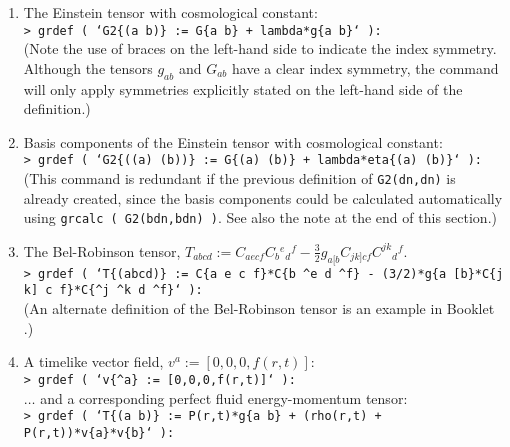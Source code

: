 \documentclass{article}
\begin{document}
{\begin{enumerate}
    \texttt{> grdef ( `phi := R\{a b\}*u\{\^{}a\}*u\{\^{}b\}` ):}\\

  \item The Einstein tensor with cosmological constant:\\

    \texttt{> grdef ( `G2\{(a b)\} := G\{a b\} + lambda*g\{a b\}` ):}\\

    (Note the use of braces on the left-hand side to indicate the index 
    symmetry. Although the tensors $g_{ab}$ and $G_{ab}$ have a clear
    index symmetry, the  command will only apply symmetries
    explicitly stated on the left-hand side of the definition.)

  \item Basis components of the Einstein tensor with cosmological constant:\\

    \texttt{> grdef ( `G2\{((a) (b))\} := G\{(a) (b)\} +
      lambda*eta\{(a) (b)\}` ):}\\

    (This command is redundant if the previous definition of \texttt{G2(dn,dn)}
    is already created, since the basis components could be calculated
    automatically using \texttt{grcalc ( G2(bdn,bdn) )}. See also the note
    at the end of this section.)

  \item The Bel-Robinson tensor,
    $T_{abcd} := C_{aecf} C_b{}^e{}_d{}^f -
    \frac{3}{2} g_{a[b} C_{jk]cf} C^{jk}{}_d{}^f$.\\

    \texttt{> grdef ( `T\{(abcd)\} := C\{a e c f\}*C\{b \^{}e d \^{}f\}
      - (3/2)*g\{a [b\}*C\{j k] c f\}*C\{\^{}j \^{}k d \^{}f\}` ):}\\

    (An alternate definition of the Bel-Robinson tensor is an example
    in Booklet \grIntroRef.)

  \item A timelike vector field, $v^a := [0,0,0,f(r,t)]$:\\

    \texttt{> grdef ( `v\{\^{}a\} := [0,0,0,f(r,t)]` ):}\\

  $\ldots$ and a corresponding perfect fluid energy-momentum tensor:\\

    \texttt{> grdef ( `T\{(a b)\} := P(r,t)*g\{a b\}
      + (rho(r,t) + P(r,t))*v\{a\}*v\{b\}` ):}\\


\end{enumerate}}
\end{document}
